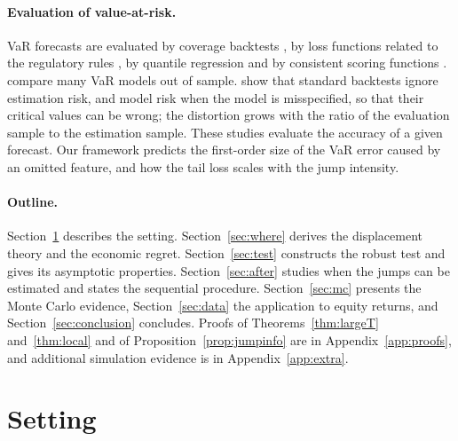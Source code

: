 \documentclass[11pt,a4paper]{article}
\theoremstyle{definition}
\theoremstyle{remark}
\begin{document}
\paragraph{Evaluation of value-at-risk.} VaR forecasts are evaluated by coverage backtests \citep{kupiec1995,christoffersen1998,christoffersen2004}, by loss functions related to the regulatory rules \citep{lopez1999}, by quantile regression \citep{gaglianone2011} and by consistent scoring functions \citep{gneiting2011}. \citet{kuester2006} compare many VaR models out of sample. \citet{escanciano2010} show that standard backtests ignore estimation risk, and model risk when the model is misspecified, so that their critical values can be wrong; the distortion grows with the ratio of the evaluation sample to the estimation sample. These studies evaluate the accuracy of a given forecast. Our framework predicts the first-order size of the VaR error caused by an omitted feature, and how the tail loss scales with the jump intensity.

\paragraph{Outline.} Section~\ref{sec:setting} describes the setting. Section~\ref{sec:where} derives the displacement theory and the economic regret. Section~\ref{sec:test} constructs the robust test and gives its asymptotic properties. Section~\ref{sec:after} studies when the jumps can be estimated and states the sequential procedure. Section~\ref{sec:mc} presents the Monte Carlo evidence, Section~\ref{sec:data} the application to equity returns, and Section~\ref{sec:conclusion} concludes. Proofs of Theorems~\ref{thm:largeT} and~\ref{thm:local} and of Proposition~\ref{prop:jumpinfo} are in Appendix~\ref{app:proofs}, and additional simulation evidence is in Appendix~\ref{app:extra}.

\section{Setting}\label{sec:setting}
\end{document}
